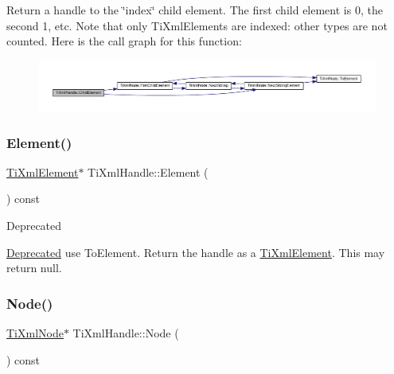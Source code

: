 Return a handle to the \char`\"{}index\char`\"{} child element. The first child element is 0, the second 1, etc. Note that only Ti\+Xml\+Elements are indexed\+: other types are not counted. Here is the call graph for this function\+:
\nopagebreak
\begin{figure}[H]
\begin{center}
\leavevmode
\includegraphics[width=350pt]{classTiXmlHandle_a57a639ab0ac99ff9358f675a1b73049a_cgraph}
\end{center}
\end{figure}
\mbox{\label{classTiXmlHandle_ae9b22d71bf5f69ee5fda28f5ad21f19c}} 
\subsubsection{\texorpdfstring{Element()}{Element()}}
{\footnotesize\ttfamily \hyperlink{classTiXmlElement}{Ti\+Xml\+Element}$\ast$ Ti\+Xml\+Handle\+::\+Element (\begin{DoxyParamCaption}{ }\end{DoxyParamCaption}) const\hspace{0.3cm}{\ttfamily [inline]}}

\begin{DoxyRefDesc}{Deprecated}
\item[\hyperlink{deprecated__deprecated000002}{Deprecated}]use To\+Element. Return the handle as a \hyperlink{classTiXmlElement}{Ti\+Xml\+Element}. This may return null. \end{DoxyRefDesc}
\mbox{\label{classTiXmlHandle_aec0e3ea58ff98a45cd13507a02e2ca1e}} 
\subsubsection{\texorpdfstring{Node()}{Node()}}
{\footnotesize\ttfamily \hyperlink{classTiXmlNode}{Ti\+Xml\+Node}$\ast$ Ti\+Xml\+Handle\+::\+Node (\begin{DoxyParamCaption}{ }\end{DoxyParamCaption}) const\hspace{0.3cm}{\ttfamily [inline]}}

